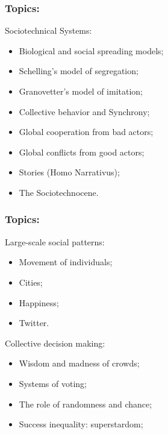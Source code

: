 \begin{frame}
  \frametitle{Topics:}


  \begin{block}{Sociotechnical Systems:}
    \begin{itemize}
    \item 
      Biological and social spreading models;
    \item 
      Schelling's model of segregation;\cite{schelling1971a}
    \item 
      Granovetter's model of imitation;\cite{granovetter1978a}
    \item 
      Collective behavior and Synchrony;
    \item 
      Global cooperation from bad actors;
    \item 
      Global conflicts from good actors;
    \item 
      Stories (Homo Narrativus);
    \item 
      The Sociotechnocene.
    \end{itemize}
  \end{block}

\end{frame}

\begin{frame}
  \frametitle{Topics:}

  \begin{block}{Large-scale social patterns:}
    \begin{itemize}
    \item 
      Movement of individuals;
    \item 
      Cities;
    \item 
      Happiness;
    \item 
      Twitter.
    \end{itemize}
  \end{block}

  \begin{block}{Collective decision making:}
    \begin{itemize}
    \item 
      Wisdom and madness of crowds;
    \item 
      Systems of voting;
    \item 
      The role of randomness and chance;
    \item 
      Success inequality: superstardom;
    \end{itemize}
  \end{block}


\end{frame}

